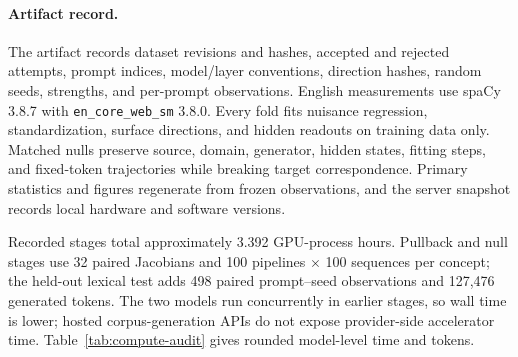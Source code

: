 \paragraph{Artifact record.} The artifact records dataset revisions and hashes, accepted and rejected attempts, prompt indices, model/layer conventions, direction hashes, random seeds, strengths, and per-prompt observations. English measurements use spaCy 3.8.7 with \texttt{en\_core\_web\_sm} 3.8.0. Every fold fits nuisance regression, standardization, surface directions, and hidden readouts on training data only. Matched nulls preserve source, domain, generator, hidden states, fitting steps, and fixed-token trajectories while breaking target correspondence. Primary statistics and figures regenerate from frozen observations, and the server snapshot records local hardware and software versions.

Recorded stages total approximately 3.392 GPU-process hours. Pullback and null stages use 32 paired Jacobians and 100 pipelines \(\times\) 100 sequences per concept; the held-out lexical test adds 498 paired prompt--seed observations and 127,476 generated tokens. The two models run concurrently in earlier stages, so wall time is lower; hosted corpus-generation APIs do not expose provider-side accelerator time. Table~\ref{tab:compute-audit} gives rounded model-level time and tokens.

